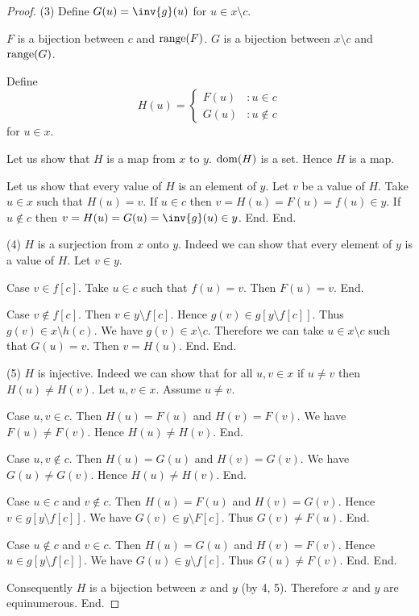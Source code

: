 \documentclass{article}
\begin{document}
\begin{forthel}
\begin{proof}
        (3) Define $G(u) = \inv{g}(u)$ for $u \in x \setminus c$.

        $F$ is a bijection between $c$ and $\operatorname{range}(F)$.
        $G$ is a bijection between $x \setminus c$ and $\operatorname{range}(G)$.

        Define \[ H(u) =
          \begin{cases}
            F(u) & : u \in c \\
            G(u) & : u \notin c
          \end{cases} \]
        for $u \in x$.

        Let us show that $H$ is a map from $x$ to $y$.
          $\operatorname{dom}(H)$ is a set.
          Hence $H$ is a map.

          Let us show that every value of $H$ is an element of $y$.
            Let $v$ be a value of $H$.
            Take $u \in x$ such that $H(u) = v$.
            If $u \in c$ then $v = H(u) = F(u) = f(u) \in y$.
            If $u \notin c$ then $v = H(u) = G(u) = \inv{g}(u) \in y$.
          End.
        End.

        (4) $H$ is a surjection from $x$  onto $y$.
        Indeed we can show that every element of $y$ is a value of $H$.
          Let $v \in y$.

          Case $v \in f[c]$.
            Take $u \in c$ such that $f(u) = v$.
            Then $F(u) = v$.
          End.

          Case $v \notin f[c]$.
            Then $v \in y \setminus f[c]$.
            Hence $g(v) \in g[y \setminus f[c]]$.
            Thus $g(v) \in x \setminus h(c)$.
            We have $g(v) \in x \setminus c$.
            Therefore we can take $u \in x \setminus c$ such that $G(u) = v$.
            Then $v = H(u)$.
          End.
        End.

        (5) $H$ is injective.
        Indeed we can show that for all $u, v \in x$ if $u \neq v$ then
        $H(u) \neq H(v)$.
          Let $u,v \in x$.
          Assume $u \neq v$.

          Case $u,v \in c$.
            Then $H(u) = F(u)$ and $H(v) = F(v)$.
            We have $F(u) \neq F(v)$.
            Hence $H(u) \neq H(v)$.
          End.

          Case $u,v \notin c$.
            Then $H(u) = G(u)$ and $H(v) = G(v)$.
            We have $G(u) \neq G(v)$.
            Hence $H(u) \neq H(v)$.
          End.

          Case $u \in c$ and $v \notin c$.
            Then $H(u) = F(u)$ and $H(v) = G(v)$.
            Hence $v \in g[y \setminus f[c]]$.
            We have $G(v) \in y \setminus F[c]$.
            Thus $G(v) \neq F(u)$.
          End.

          Case $u \notin c$ and $v \in c$.
            Then $H(u) = G(u)$ and $H(v) = F(v)$.
            Hence $u \in g[y \setminus f[c]]$.
            We have $G(u) \in y \setminus f[c]$.
            Thus $G(u) \neq F(v)$.
          End.
        End.

        Consequently $H$ is a bijection between $x$ and $y$ (by 4, 5).
        Therefore $x$ and $y$ are equinumerous.
      End.
    \end{proof}
  \end{forthel}
\end{document}
